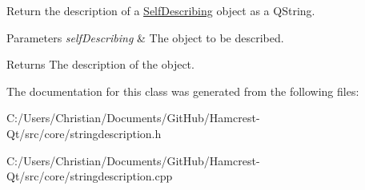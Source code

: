 Return the description of a \hyperlink{class_hamcrest_qt_1_1_self_describing}{Self\-Describing} object as a {\ttfamily Q\-String}. 


\begin{DoxyParams}{Parameters}
{\em self\-Describing} & The object to be described. \\
\hline
\end{DoxyParams}
\begin{DoxyReturn}{Returns}
The description of the object. 
\end{DoxyReturn}


The documentation for this class was generated from the following files\-:\begin{DoxyCompactItemize}
\item 
C\-:/\-Users/\-Christian/\-Documents/\-Git\-Hub/\-Hamcrest-\/\-Qt/src/core/stringdescription.\-h\item 
C\-:/\-Users/\-Christian/\-Documents/\-Git\-Hub/\-Hamcrest-\/\-Qt/src/core/stringdescription.\-cpp\end{DoxyCompactItemize}
